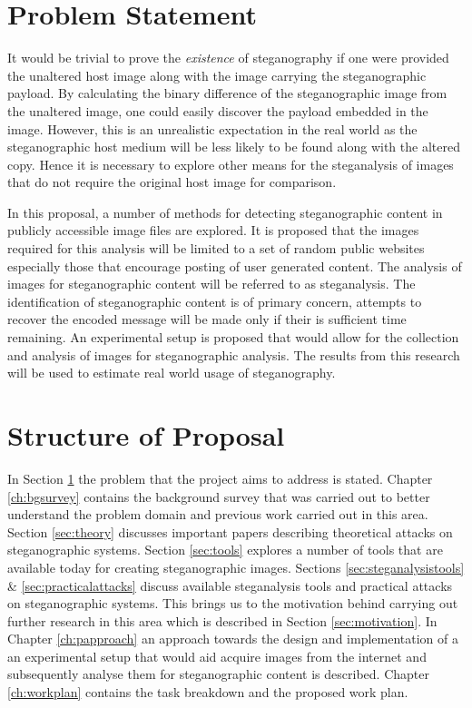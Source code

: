 \documentclass[12pt]{extreport}
\begin{document}
\section{Problem Statement}
\label{sec:probstatement}
It would be trivial to prove the \emph{existence} of steganography if one were provided the unaltered host image along with the image carrying the steganographic payload. By calculating the binary difference of the steganographic image from the unaltered image, one could easily discover the payload embedded in the image. However, this is an unrealistic expectation in the real world as the steganographic host medium will be less likely to be found along with the altered copy. Hence it is necessary to explore other means for the steganalysis of images that do not require the original host image for comparison.

In this proposal, a number of methods for detecting steganographic content in publicly accessible image files are explored. It is proposed that the images required for this analysis will be limited to a set of random public websites especially those that encourage posting of user generated content. The analysis of images for steganographic content will be referred to as steganalysis. The identification of steganographic content is of primary concern, attempts to recover the encoded message will be made only if their is sufficient time remaining. An experimental setup is proposed that would allow for the collection and analysis of images for steganographic analysis. The results from this research will be used to estimate real world usage of steganography. 
\section{Structure of Proposal}
\label{sec:structure}
In Section \ref{sec:probstatement} the problem that the project aims to address is stated. Chapter \ref{ch:bgsurvey} contains the background survey that was carried out to better understand the problem domain and previous work carried out in this area. Section \ref{sec:theory} discusses important papers describing theoretical attacks on steganographic systems. Section \ref{sec:tools} explores a number of tools that are available today for creating steganographic images. Sections \ref{sec:steganalysistools} \& \ref{sec:practicalattacks} discuss available steganalysis tools and practical attacks on steganographic systems. This brings us to the motivation behind carrying out further research in this area which is described in Section \ref{sec:motivation}. In Chapter \ref{ch:papproach} an approach towards the design and implementation of a an experimental setup that would aid acquire images from the internet and subsequently analyse them for steganographic content is described. Chapter \ref{ch:workplan} contains the task breakdown and the proposed work plan. 
\end{document}
